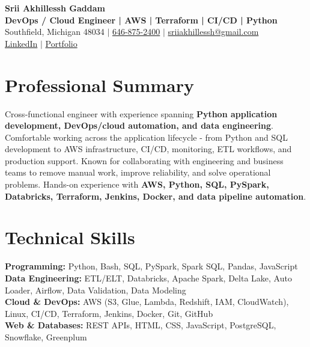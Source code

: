 \documentclass[letterpaper,10pt]{article}
\begin{document}
\fontsize{9.35pt}{10.45pt}\selectfont

\begin{center}
    {\LARGE \textbf{Srii Akhillessh Gaddam}} \\[-1pt]
    \textbf{DevOps / Cloud Engineer | AWS | Terraform | CI/CD | Python} \\[2pt]
    Southfield, Michigan 48034 $|$
    \href{tel:6468752400}{646-875-2400} $|$
    \href{mailto:sriiakhillessh@gmail.com}{sriiakhillessh@gmail.com} \\[1pt]
    \href{https://www.linkedin.com/in/srii-akhiilessh-gaddam-b48668191/}{LinkedIn} $|$
    \href{https://sriiakhillesshg.github.io/portfolio/}{Portfolio}
\end{center}
\vspace{-8pt}

\section{Professional Summary}
\small{Cross-functional engineer with experience spanning \textbf{Python application development, DevOps/cloud automation, and data engineering}. Comfortable working across the application lifecycle - from Python and SQL development to AWS infrastructure, CI/CD, monitoring, ETL workflows, and production support. Known for collaborating with engineering and business teams to remove manual work, improve reliability, and solve operational problems. Hands-on experience with \textbf{AWS, Python, SQL, PySpark, Databricks, Terraform, Jenkins, Docker, and data pipeline automation}.}

\section{Technical Skills}
\small{
\textbf{Programming:} Python, Bash, SQL, PySpark, Spark SQL, Pandas, JavaScript \\
\textbf{Data Engineering:} ETL/ELT, Databricks, Apache Spark, Delta Lake, Auto Loader, Airflow, Data Validation, Data Modeling \\
\textbf{Cloud \& DevOps:} AWS (S3, Glue, Lambda, Redshift, IAM, CloudWatch), Linux, CI/CD, Terraform, Jenkins, Docker, Git, GitHub \\
\textbf{Web \& Databases:} REST APIs, HTML, CSS, JavaScript, PostgreSQL, Snowflake, Greenplum
}
\end{document}
